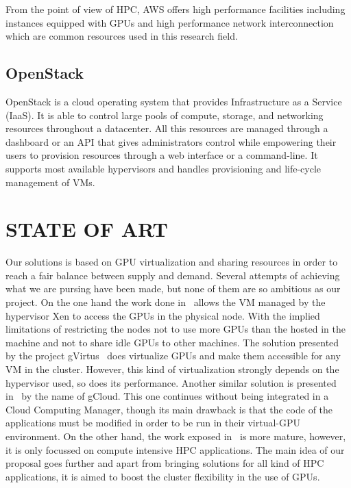 \documentclass[a4paper,twoside]{article}
\begin{document}
From the point of view of HPC, AWS offers high performance facilities including 
instances equipped with GPUs and high performance network interconnection which 
are common resources used in this research field.

\subsection{OpenStack}
\label{sec:openstack}

OpenStack is a cloud operating system that provides Infrastructure as a Service (IaaS). 
It is able to control large pools of compute, storage, and networking resources throughout a 
datacenter. All this resources are managed through a dashboard or an API that gives administrators 
control while empowering their users to provision resources through a web interface
or a command-line. 
It supports most available hypervisors and handles provisioning 
and life-cycle management of VMs. 

\section{\uppercase{State of Art}}
\label{sec:state}
Our solutions
is based on GPU virtualization and sharing resources in order
to reach a fair balance between supply and demand.
Several attempts of achieving what we are pursing have been
made, but none of them are so ambitious as our project. On
the one hand the work done in~\cite{younge2013enabling} allows the VM managed
by the hypervisor Xen to access the GPUs in the physical
node. With the implied limitations of restricting the nodes not
to use more GPUs than the hosted in the machine and not
to share idle GPUs to other machines. The solution presented
by the project gVirtus~\cite{giunta2010gpgpu} does virtualize GPUs and make
them accessible for any VM in the cluster. However, this kind
of virtualization strongly depends on the hypervisor used, so
does its performance. Another similar solution is presented in~\cite{diab2013dynamic} by the name of gCloud. This one continues without being
integrated in a Cloud Computing Manager, though its main
drawback is that the code of the applications must be modified
in order to be run in their virtual-GPU environment. On the
other hand, the work exposed in~\cite{jungpgpu} is more mature, however,
it is only focussed on compute intensive HPC applications.
The main idea of our proposal goes further and apart from
bringing solutions for all kind of HPC applications, it is aimed
to boost the cluster flexibility in the use of GPUs.
\end{document}
